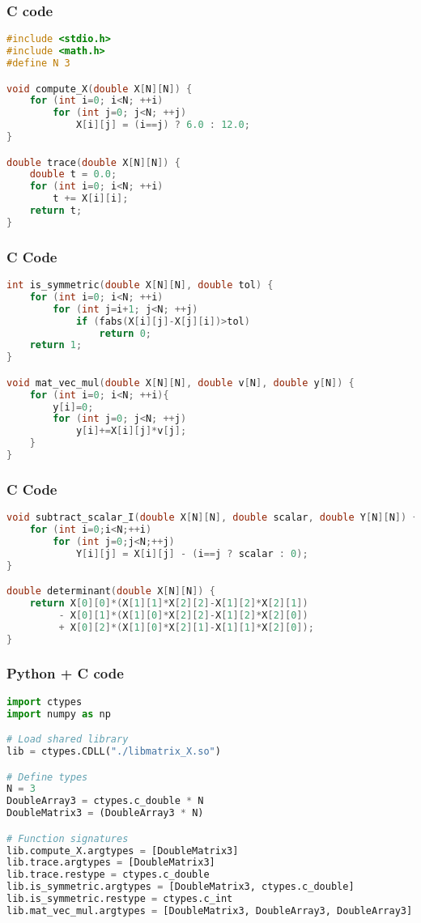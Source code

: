 \documentclass{beamer}
\begin{document}
\begin{frame}[fragile]
\frametitle{C code}
    \begin{lstlisting}[language=C]
#include <stdio.h>
#include <math.h>
#define N 3

void compute_X(double X[N][N]) {
    for (int i=0; i<N; ++i)
        for (int j=0; j<N; ++j)
            X[i][j] = (i==j) ? 6.0 : 12.0;
}

double trace(double X[N][N]) {
    double t = 0.0;
    for (int i=0; i<N; ++i)
        t += X[i][i];
    return t;
}
\end{lstlisting}
\end{frame}
\begin{frame}[fragile]
    \frametitle{C Code }
    \begin{lstlisting}[language=C]
int is_symmetric(double X[N][N], double tol) {
    for (int i=0; i<N; ++i)
        for (int j=i+1; j<N; ++j)
            if (fabs(X[i][j]-X[j][i])>tol)
                return 0;
    return 1;
}

void mat_vec_mul(double X[N][N], double v[N], double y[N]) {
    for (int i=0; i<N; ++i){
        y[i]=0;
        for (int j=0; j<N; ++j)
            y[i]+=X[i][j]*v[j];
    }
}
     \end{lstlisting}
\end{frame}
\begin{frame}[fragile]
    \frametitle{C Code }
    \begin{lstlisting}[language=C]
void subtract_scalar_I(double X[N][N], double scalar, double Y[N][N]) {
    for (int i=0;i<N;++i)
        for (int j=0;j<N;++j)
            Y[i][j] = X[i][j] - (i==j ? scalar : 0);
}

double determinant(double X[N][N]) {
    return X[0][0]*(X[1][1]*X[2][2]-X[1][2]*X[2][1])
         - X[0][1]*(X[1][0]*X[2][2]-X[1][2]*X[2][0])
         + X[0][2]*(X[1][0]*X[2][1]-X[1][1]*X[2][0]);
}    
     \end{lstlisting}
\end{frame}
\begin{frame}[fragile]
    \frametitle{Python + C code}

    \begin{lstlisting}[language=Python]
import ctypes
import numpy as np

# Load shared library
lib = ctypes.CDLL("./libmatrix_X.so")

# Define types
N = 3
DoubleArray3 = ctypes.c_double * N
DoubleMatrix3 = (DoubleArray3 * N)

# Function signatures
lib.compute_X.argtypes = [DoubleMatrix3]
lib.trace.argtypes = [DoubleMatrix3]
lib.trace.restype = ctypes.c_double
lib.is_symmetric.argtypes = [DoubleMatrix3, ctypes.c_double]
lib.is_symmetric.restype = ctypes.c_int
lib.mat_vec_mul.argtypes = [DoubleMatrix3, DoubleArray3, DoubleArray3]
\end{lstlisting}
\end{frame}
\end{document}
